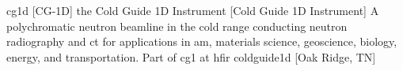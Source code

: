 \newglsXinstitution%
{cg1d}%
[CG{\--}1D]%
{the Cold Guide 1D Instrument}%
[Cold Guide 1D Instrument]%
{A polychromatic neutron \gls{beamline} in the cold range conducting neutron radiography and \gls{ct} for applications in \gls{am}, materials science, geoscience, biology, energy, and transportation. Part of \gls{cg1} at \gls{hfir} \cite{website:HFIR:CG1D}}%
{coldguide1d}%
[Oak Ridge, TN]%
